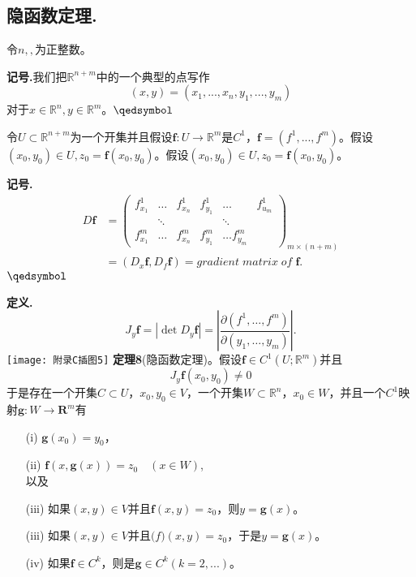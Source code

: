 \documentclass[leqno]{article}%
\begin{document}
\subsection{隐函数定理.}
令$n,,$为正整数。\par
\noindent\textbf{记号.}我们把$\mathbb{R}^{n+m}$中的一个典型的点写作
\begin{equation*}
(x,y)=(x_{1},...,x_{n},y_{1},...,y_{m})
\end{equation*}
对于$x\in\mathbb{R}^{n},y\in\mathbb{R}^{m}$。$\hfill\qedsymbol$
\par
令$U\subset\mathbb{R}^{n+m}$为一个开集并且假设$\mathbf{f}:U\rightarrow\mathbb{R}^{m}$是$C^{1}$，$\mathbf{f}=(f^{1},...,f^{m})$。假设$(x_{0},y_{0})\in U,z_{0}=\mathbf{f}(x_{0},y_{0})$。假设$(x_{0},y_{0})\in U,z_{0}=\mathbf{f}(x_{0},y_{0})$。\par
\noindent\textbf{记号.}
\begin{equation*}
\begin{aligned}
D\mathbf{f}
&=
\begin{pmatrix}
f_{x_{1}}^{1} & \ldots & f_{x_{n}}^{1} & f_{y_{1}}^{1} & \ldots & f_{u_{m}}^{1}\\
 & \ddots & & & \ddots &\\
f_{x_{1}}^{m} & \ldots & f_{x_{n}}^{m} & f_{y_{1}}^{m} & \ldots f_{y_{m}}^{m}
\end{pmatrix}_{m\times (n+m)}
\\
&=(D_{x}\mathbf{f},D_{f}\mathbf{f})=gradient\;matrix\;of\;\mathbf{f}.
\end{aligned}
\end{equation*}
$\hfill\qedsymbol$
\par
\noindent\textbf{定义.}
\begin{equation*}
J_{y}\mathbf{f}=|\det D_{y}\mathbf{f}|=\left|\frac{\partial (f^{1},\ldots,f^{m})}{\partial(y_{1},\ldots,y_{m})}\right|.
\end{equation*}
\texttt{[image: 附录C插图5]}
\textbf{定理8}(隐函数定理)。假设$\mathbf{f}\in C^{1}(U;\mathbb{R}^{m})$并且
\begin{equation*}
J_{y}\mathbf{f}(x_{0},y_{0})\neq 0
\end{equation*}
于是存在一个开集$C\subset U$，$x_{0},y_{0}\in V$，一个开集$W\subset \mathbb{R}^{n}$，$x_{0}\in W$，并且一个$C^{1}$映射$\mathbf{g}:W\rightarrow \mathbf{R}^{m}$有
\begin{enumerate}[fullwidth,itemindent=2em]
	\item[(i)]$\mathbf{g}(x_{0})=y_{0}$，
	\item[(ii)]$\mathbf{f}(x,\mathbf{g}(x))=z_{0}\quad(x\in W)$, \\
	以及\vspace{-2ex}
	\item[(iii)]如果$(x,y)\in V$并且$\mathbf{f}(x,y)=z_{0}$，则$y=\mathbf{g}(x)$。
	\item[(iii)]如果$(x,y)\in V$并且$\mathbf(f)(x,y)=z_{0}$，于是$y=\mathbf{g}(x)$。
	\item[(iv)]如果$\mathbf{f}\in C^{k}$，则是$\mathbf{g}\in C^{k}(k=2,...)$。
\end{enumerate}
\par
\end{document}
